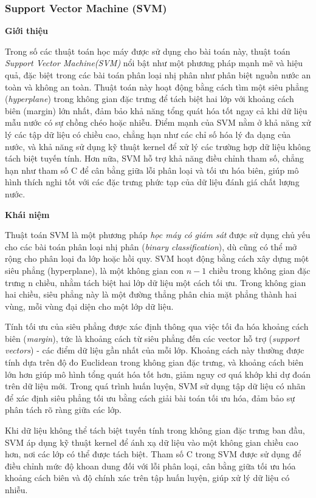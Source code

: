 \subsubsection{Support Vector Machine (SVM)}

\textbf{\large G}\textbf{iới thiệu}

Trong số các thuật toán học máy được sử dụng cho bài toán này, thuật toán \textit{Support Vector Machine(SVM)} nổi bật như một phương pháp mạnh mẽ và hiệu quả, đặc biệt trong các bài toán phân loại nhị phân như phân biệt nguồn nước an toàn và không an toàn. Thuật toán này hoạt động bằng cách tìm một siêu phẳng (\textit{hyperplane}) trong không gian đặc trưng để tách biệt hai lớp với khoảng cách biên (margin) lớn nhất, đảm bảo khả năng tổng quát hóa tốt ngay cả khi dữ liệu mẫu nước có sự chồng chéo hoặc nhiễu. Điểm mạnh của SVM nằm ở khả năng xử lý các tập dữ liệu có chiều cao, chẳng hạn như các chỉ số hóa lý đa dạng của nước, và khả năng sử dụng kỹ thuật kernel để xử lý các trường hợp dữ liệu không tách biệt tuyến tính. Hơn nữa, SVM hỗ trợ khả năng điều chỉnh tham số, chẳng hạn như tham số C để cân bằng giữa lỗi phân loại và tối ưu hóa biên, giúp mô hình thích nghi tốt với các đặc trưng phức tạp của dữ liệu đánh giá chất lượng nước.

\textbf{\large K}\textbf{hái niệm} 

Thuật toán SVM là một phương pháp \textit{học máy có giám sát} được sử dụng chủ yếu cho các bài toán phân loại nhị phân (\textit{binary classification}), dù cũng có thể mở rộng cho phân loại đa lớp hoặc hồi quy. SVM hoạt động bằng cách xây dựng một siêu phẳng (hyperplane), là một không gian con $n-1$ chiều trong không gian đặc trưng n chiều, nhằm tách biệt hai lớp dữ liệu một cách tối ưu. Trong không gian hai chiều, siêu phẳng này là một đường thẳng phân chia mặt phẳng thành hai vùng, mỗi vùng đại diện cho một lớp dữ liệu.

Tính tối ưu của siêu phẳng được xác định thông qua việc tối đa hóa khoảng cách biên (\textit{margin}), tức là khoảng cách từ siêu phẳng đến các vector hỗ trợ (\textit{support vectors}) - các điểm dữ liệu gần nhất của mỗi lớp. Khoảng cách này thường được tính dựa trên độ đo Euclidean trong không gian đặc trưng, và khoảng cách biên lớn hơn giúp mô hình tổng quát hóa tốt hơn, giảm nguy cơ quá khớp khi dự đoán trên dữ liệu mới. Trong quá trình huấn luyện, SVM sử dụng tập dữ liệu có nhãn để xác định siêu phẳng tối ưu bằng cách giải bài toán tối ưu hóa, đảm bảo sự phân tách rõ ràng giữa các lớp.

Khi dữ liệu không thể tách biệt tuyến tính trong không gian đặc trưng ban đầu, SVM áp dụng kỹ thuật kernel để ánh xạ dữ liệu vào một không gian chiều cao hơn, nơi các lớp có thể được tách biệt. Tham số C trong SVM được sử dụng để điều chỉnh mức độ khoan dung đối với lỗi phân loại, cân bằng giữa tối ưu hóa khoảng cách biên và độ chính xác trên tập huấn luyện, giúp xử lý dữ liệu có nhiễu.

